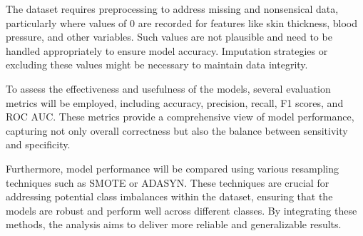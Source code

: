 \documentclass[12pt,a4paper]{article}
\begin{document}
	\par
    \par
    The dataset requires preprocessing to address missing and nonsensical data, particularly where values of 0 are recorded for features like skin thickness, blood pressure, and other variables. Such values are not plausible and need to be handled appropriately to ensure model accuracy. Imputation strategies or excluding these values might be necessary to maintain data integrity.
    \par
    To assess the effectiveness and usefulness of the models, several evaluation metrics will be employed, including accuracy, precision, recall, F1 scores, and ROC AUC. These metrics provide a comprehensive view of model performance, capturing not only overall correctness but also the balance between sensitivity and specificity.
    \par
    Furthermore, model performance will be compared using various resampling techniques such as SMOTE or ADASYN. These techniques are crucial for addressing potential class imbalances within the dataset, ensuring that the models are robust and perform well across different classes. By integrating these methods, the analysis aims to deliver more reliable and generalizable results.
	\par 
\end{document}
